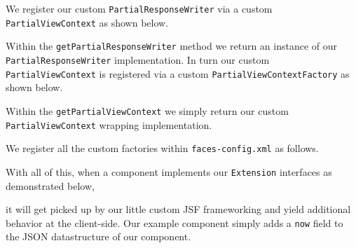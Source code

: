 We register our custom \texttt{PartialResponseWriter} via a custom \texttt{PartialViewContext} as shown below.

Within the \texttt{getPartialResponseWriter} method we return an instance of our \texttt{Partial\allowbreak ResponseWriter} implementation.
In turn our custom \texttt{PartialViewContext} is registered via a custom \texttt{PartialViewContextFactory} as shown below.

Within the \texttt{getPartialViewContext} we simply return our custom \texttt{PartialViewContext} wrapping implementation.

We register all the custom factories within \texttt{faces-config.xml} as follows.


With all of this, when a component implements our \texttt{Extension} interfaces as demonstrated below,

it will get picked up by our little custom JSF frameworking and yield additional behavior at the client-side.
Our example component simply adds a \texttt{now} field to the JSON datastructure of our component.

